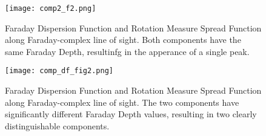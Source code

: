 \documentclass{article}
\begin{document}
\begin{figure}[hbt!]
\centering
\texttt{[image: comp2\_f2.png]}
\label{fig:rel_err}
\caption{Faraday Dispersion Function and Rotation Measure Spread Function along Faraday-complex line of sight. Both components have the same Faraday Depth, resultinfg in the apperance of a single peak.}
\end{figure}

\begin{figure}[hbt!]
\centering
\texttt{[image: comp\_df\_fig2.png]}
\label{fig:rel_err}
\caption{Faraday Dispersion Function and Rotation Measure Spread Function along Faraday-complex line of sight. The two components have significantly different Faraday Depth values, resulting in two clearly distinguishable components.}
\end{figure}
\end{document}
